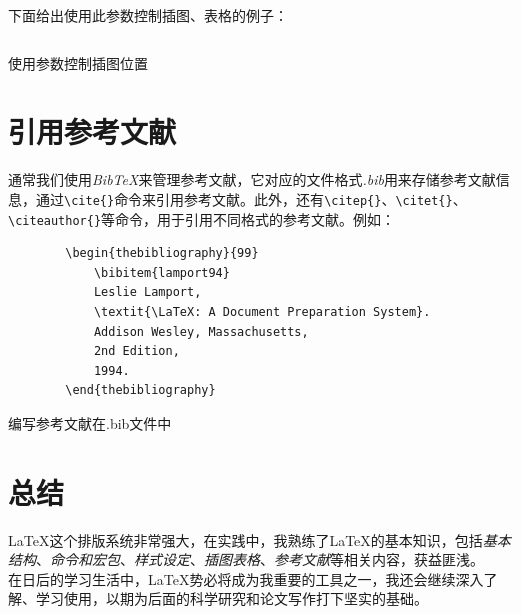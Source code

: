 下面给出使用此参数控制插图、表格的例子：

\begin{longlisting}
    \inputminted{latex}{../Code/structor_show.tex}
    \caption{使用参数控制插图位置}
    \label{listing:figure-latex-env}
\end{longlisting}

\section{引用参考文献}

通常我们使用\textit{BibTeX}来管理参考文献，它对应的文件格式\textit{.bib}用来存储参考文献信息，通过\verb|\cite{}|命令来引用参考文献。此外，还有\verb|\citep{}|、\verb|\citet{}|、\verb|\citeauthor{}|等命令，用于引用不同格式的参考文献。例如：

\begin{longlisting}
    \begin{verbatim}
        \begin{thebibliography}{99}
            \bibitem{lamport94}
            Leslie Lamport,
            \textit{\LaTeX: A Document Preparation System}.
            Addison Wesley, Massachusetts,
            2nd Edition,
            1994.
        \end{thebibliography}
    \end{verbatim}
    \caption{编写参考文献在.bib文件中}
    \label{listing:manual-bib}
\end{longlisting}


\section{总结}

\LaTeX{}这个排版系统非常强大，在实践中，我熟练了\LaTeX{}的基本知识，包括\textit{基本结构}、\textit{命令和宏包}、\textit{样式设定}、\textit{插图表格}、\textit{参考文献}等相关内容，获益匪浅。\\

在日后的学习生活中，\LaTeX{}势必将成为我重要的工具之一，我还会继续深入了解、学习使用，以期为后面的科学研究和论文写作打下坚实的基础。\\